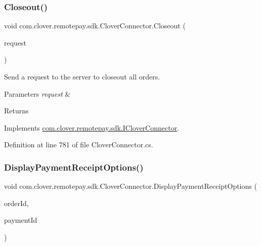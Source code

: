 \subsubsection{\texorpdfstring{Closeout()}{Closeout()}}
{\footnotesize\ttfamily void com.\+clover.\+remotepay.\+sdk.\+Clover\+Connector.\+Closeout (\begin{DoxyParamCaption}\item[{\hyperlink{classcom_1_1clover_1_1remotepay_1_1sdk_1_1_closeout_request}{Closeout\+Request}}]{request }\end{DoxyParamCaption})}



Send a request to the server to closeout all orders. 


\begin{DoxyParams}{Parameters}
{\em request} & \\
\hline
\end{DoxyParams}
\begin{DoxyReturn}{Returns}

\end{DoxyReturn}


Implements \hyperlink{interfacecom_1_1clover_1_1remotepay_1_1sdk_1_1_i_clover_connector_ac4f3cd841d87046f329e98d058f65e55}{com.\+clover.\+remotepay.\+sdk.\+I\+Clover\+Connector}.



Definition at line 781 of file Clover\+Connector.\+cs.

\mbox{\label{classcom_1_1clover_1_1remotepay_1_1sdk_1_1_clover_connector_a3c71f60836d40aa51b70841f7be6cf30}} 
\subsubsection{\texorpdfstring{Display\+Payment\+Receipt\+Options()}{DisplayPaymentReceiptOptions()}}
{\footnotesize\ttfamily void com.\+clover.\+remotepay.\+sdk.\+Clover\+Connector.\+Display\+Payment\+Receipt\+Options (\begin{DoxyParamCaption}\item[{string}]{order\+Id,  }\item[{string}]{payment\+Id }\end{DoxyParamCaption})}



